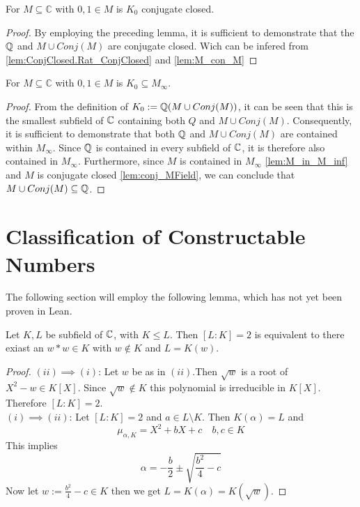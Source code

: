 \begin{corollary}
    \label{cor:K_zero_conjectClosed}
    \leanok
    For $M\subseteq \mathbb{C}$ with $0,1 \in M$ is $K_0$ conjugate closed.
\end{corollary}
\begin{proof}
    By employing the preceding lemma, it is sufficient to demonstrate that the $\mathbb{Q}$ and $M \cup Conj(M)$ are conjugate closed. 
    Wich can be infered from \ref{lem:ConjClosed.Rat_ConjClosed} and \ref{lem:M_con_M}
\end{proof}

\begin{lemma}
    \label{lem:K_zero_in_MField}
    \leanok
    For $M\subseteq \mathbb{C}$ with $0,1 \in M$ is $K_0 \subseteq M_{\infty}$.
\end{lemma}
\begin{proof}
From the definition of $K_0 := \mathbb{Q}(M\cup Conj(M))$, 
it can be seen that this is the smallest subfield of $\mathbb{C}$ containing both $Q$ and $M\cup Conj(M)$. 
Consequently, it is sufficient to demonstrate that both $\mathbb{Q}$ and $M\cup Conj(M)$ are contained within $M_{\infty}$. 
Since $\mathbb{Q}$ is contained in every subfield of $\mathbb{C}$, it is therefore also contained in $M_{\infty}$. 
Furthermore, since $M$ is contained in $M_{\infty}$ \ref{lem:M_in_M_inf} and $M$ is conjugate closed \ref{lem:conj_MField}, we can conclude that $M\cup Conj(M) \subseteq \mathbb{Q}$.
\end{proof}

\section{Classification of Constructable Numbers}
The following section will employ the following lemma, which has not yet been proven in Lean.

\begin{lemma}
    \label{lem:dergree_two_eq_sqr}
    Let $K, L$ be subfield of $\mathbb{C}$, with $K\le L$. Then $[L:K] = 2$ is equivalent to there exiast an $w*w \in K$ with $w \notin K$ and $L = K(w)$.
\end{lemma}
\begin{proof}
    $(ii)\implies (i)$: Let $w$ be as in $(ii)$.Then $\sqrt{w}$ is a root of $X^2 - w \in K[X]$. Since $\sqrt{w} \notin K$ this polynomial is irreducible in $K[X]$. Therefore $[L:K] = 2$.\\
    $(i)\implies (ii)$: Let $[L:K] = 2$ and $a \in L \setminus K$. Then $K(\alpha) = L$ and 
    $$\mu_{\alpha, K}=X^2 + bX + c \quad b,c \in K$$
    This implies 
    $$\alpha = -\frac{b}{2} \pm \sqrt{\frac{b^2}{4} - c} $$
    Now let $w := \frac{b^2}{4} - c \in K$ then we get $L = K(\alpha) = K(\sqrt{w})$.
\end{proof}

